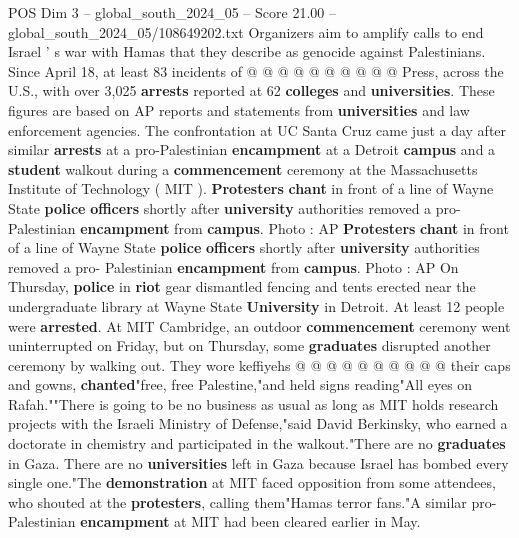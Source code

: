 \begin{textsample}{POS Dim 3 – global\_south\_2024\_05 – Score 21.00 – global\_south\_2024\_05/108649202.txt}
Organizers aim to amplify calls to end Israel ' s war with Hamas that they describe as genocide against Palestinians.
Since April 18, at least 83 incidents of @ @ @ @ @ @ @ @ @ @ Press, across the U.S., with over 3,025 \textbf{arrests} reported at 62 \textbf{colleges} and \textbf{universities}.
These figures are based on AP reports and statements from \textbf{universities} and law enforcement agencies.
The confrontation at UC Santa Cruz came just a day after similar \textbf{arrests} at a pro-Palestinian \textbf{encampment} at a Detroit \textbf{campus} and a \textbf{student} walkout during a \textbf{commencement} ceremony at the Massachusetts Institute of Technology ( MIT ). \textbf{Protesters} \textbf{chant} in front of a line of Wayne State \textbf{police} \textbf{officers} shortly after \textbf{university} authorities removed a pro- Palestinian \textbf{encampment} from \textbf{campus}.
Photo : AP \textbf{Protesters} \textbf{chant} in front of a line of Wayne State \textbf{police} \textbf{officers} shortly after \textbf{university} authorities removed a pro- Palestinian \textbf{encampment} from \textbf{campus}.
Photo : AP On Thursday, \textbf{police} in \textbf{riot} gear dismantled fencing and tents erected near the undergraduate library at Wayne State \textbf{University} in Detroit.
At least 12 people were \textbf{arrested}.
At MIT Cambridge, an outdoor \textbf{commencement} ceremony went uninterrupted on Friday, but on Thursday, some \textbf{graduates} disrupted another ceremony by walking out.
They wore keffiyehs @ @ @ @ @ @ @ @ @ @ their caps and gowns, \textbf{chanted}"free, free Palestine,"and held signs reading"All eyes on Rafah.""There is going to be no business as usual as long as MIT holds research projects with the Israeli Ministry of Defense,"said David Berkinsky, who earned a doctorate in chemistry and participated in the walkout."There are no \textbf{graduates} in Gaza.
There are no \textbf{universities} left in Gaza because Israel has bombed every single one."The \textbf{demonstration} at MIT faced opposition from some attendees, who shouted at the \textbf{protesters}, calling them"Hamas terror fans."A similar pro-Palestinian \textbf{encampment} at MIT had been cleared earlier in May.

\end{textsample}
